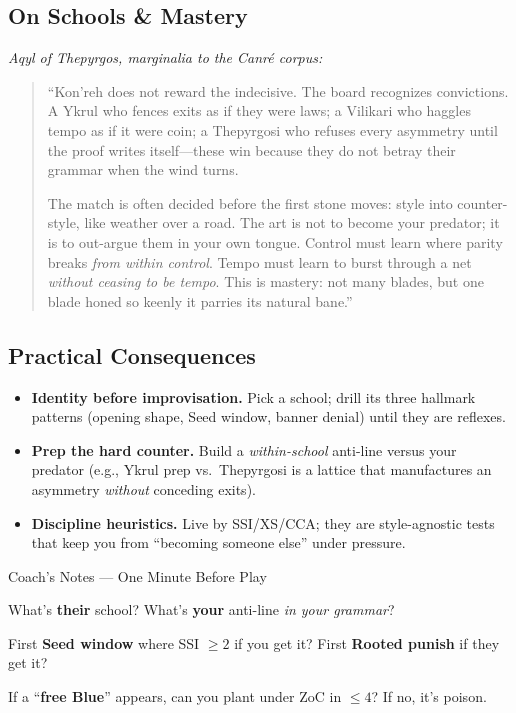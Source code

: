 \documentclass[11pt]{article}
\newenvironment{coachnotes}[1]{%
  \begin{coachbox}{#1}%
    \footnotesize
    \begin{description}[leftmargin=2.8cm,labelsep=0.6em,font=\scshape,
                        itemsep=0.25em,parsep=0pt,topsep=0.2em]
}{%
    \end{description}%
  \end{coachbox}%
}
\newcommand{\CNRow}[2]{\item[#1] #2}
\begin{document}
\subsection*{On Schools \& Mastery}
\noindent\textit{Aqyl of Thepyrgos, marginalia to the Canré corpus:}
\begin{quote}\small
``Kon'reh does not reward the indecisive. The board recognizes convictions. A Ykrul who fences exits as if they were laws; a Vilikari who haggles tempo as if it were coin; a Thepyrgosi who refuses every asymmetry until the proof writes itself---these win because they do not betray their grammar when the wind turns. 

The match is often decided before the first stone moves: style into counter-style, like weather over a road. The art is not to become your predator; it is to out-argue them in your own tongue. Control must learn where parity breaks \emph{from within control}. Tempo must learn to burst through a net \emph{without ceasing to be tempo}. This is mastery: not many blades, but one blade honed so keenly it parries its natural bane.'' 
\end{quote}


\subsection*{Practical Consequences}
\begin{itemize}
  \item \textbf{Identity before improvisation.} Pick a school; drill its three hallmark patterns (opening shape, Seed window, banner denial) until they are reflexes.
  \item \textbf{Prep the hard counter.} Build a \emph{within-school} anti-line versus your predator (e.g., Ykrul prep vs.\ Thepyrgosi is a lattice that manufactures an asymmetry \emph{without} conceding exits).
  \item \textbf{Discipline heuristics.} Live by SSI/XS/CCA; they are style-agnostic tests that keep you from ``becoming someone else'' under pressure.
\end{itemize}


\begin{coachnotes}{Coach's Notes --- One Minute Before Play}
  \CNRow{School read}{What's \textbf{their} school? What's \textbf{your} anti-line \emph{in your grammar}?}
  \CNRow{Seed windows}{First \textbf{Seed window} where SSI $\ge 2$ if you get it? First \textbf{Rooted punish} if they get it?}
  \CNRow{Free Blue test}{If a ``\textbf{free Blue}'' appears, can you plant under ZoC in $\le 4$? If no, it's poison.}
\end{coachnotes}
\end{document}
